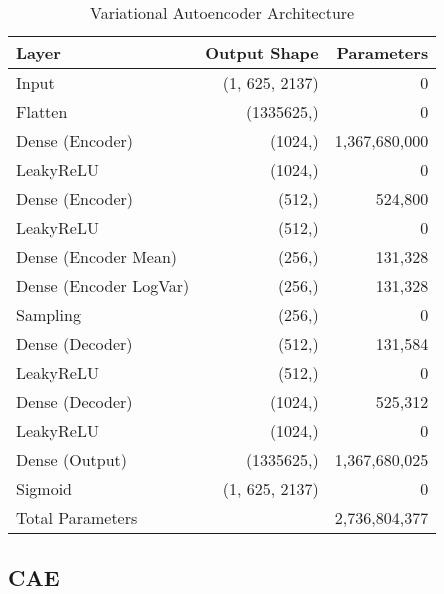 \begin{table}[!h]
    \centering
    \begin{tabular}{lrr}
        \toprule
        Layer & Output Shape & Parameters \\
        \midrule
        Input & (1, 625, 2137) & 0 \\
        Flatten & (1335625,) & 0 \\
        Dense (Encoder) & (1024,) & 1,367,680,000 \\
        LeakyReLU & (1024,) & 0 \\
        Dense (Encoder) & (512,) & 524,800 \\
        LeakyReLU & (512,) & 0 \\
        Dense (Encoder Mean) & (256,) & 131,328 \\
        Dense (Encoder LogVar) & (256,) & 131,328 \\
        Sampling & (256,) & 0 \\
        Dense (Decoder) & (512,) & 131,584 \\
        LeakyReLU & (512,) & 0 \\
        Dense (Decoder) & (1024,) & 525,312 \\
        LeakyReLU & (1024,) & 0 \\
        Dense (Output) & (1335625,) & 1,367,680,025 \\
        Sigmoid & (1, 625, 2137) & 0 \\
        \midrule
        Total Parameters & & 2,736,804,377 \\
        \bottomrule
    \end{tabular}
    \caption{Variational Autoencoder Architecture}
    \label{tab:vae}
\end{table}


\subsection{CAE}
\label{app:a-cae}

